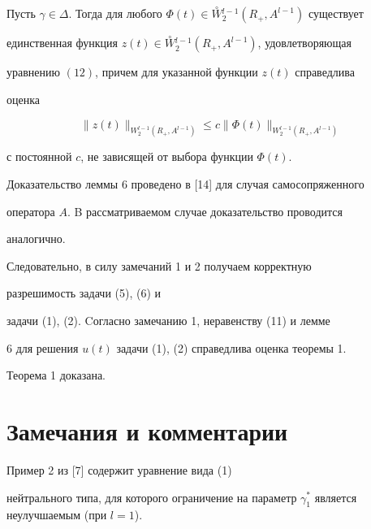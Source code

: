 \begin{lem}


Пусть $\gamma \in \Delta $. Тогда для любого $\Phi


(t) \in \overset{\circ}{W}{}^{l-1}_{2}(R_{+},A^{l-1})$ существует


единственная функция $z(t)\in


\overset{\circ}{W}{}^{l-1}_{2}(R_{+},A^{l-1})$, удовлетворяющая


уравнению $(12)$, причем для указанной функции $z(t)$ справедлива


оценка


$$


\|z(t)\|_{W^{l-1}_{2}(R_{+},A^{l-1})}\leq c\|\Phi


(t)\|_{W^{l-1}_{2}(R_{+},A^{l-1})}


$$


с постоянной $c$, не зависящей от выбора функции $\Phi (t)$.


\end{lem}





Доказательство леммы 6 проведено в [14] для случая самосопряженного


оператора $A$. B рассматриваемом случае доказательство проводится


аналогично.





Следовательно, в силу замечаний 1 и 2 получаем корректную


разрешимость задачи (5), (6) и


задачи (1), (2). Cогласно замечанию 1, неравенству (11) и лемме


6 для решения $u(t)$ задачи (1), (2) справедлива оценка теоремы 1.


Теорема 1 доказана.








\section{Замечания и комментарии}





\begin{note}


Пример 2 из [7] содержит уравнение вида (1)


нейтрального типа, для которого ограничение на параметр $\gamma


_1^*$ является неулучшаемым (при $l=1$).


\end{note}





